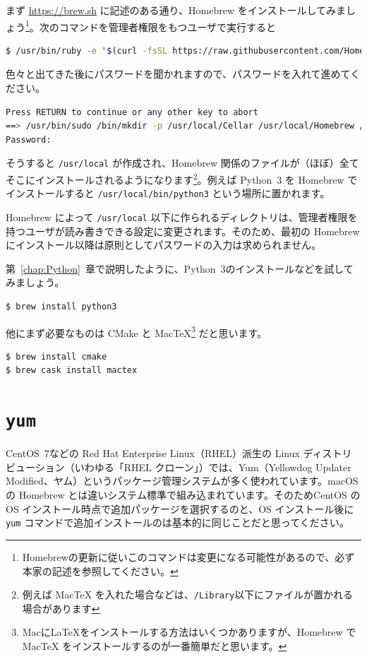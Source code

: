 まず \url{https://brew.sh} に記述のある通り、Homebrew をインストールしてみましょう\footnote{Homebrewの更新に従いこのコマンドは変更になる可能性があるので、必ず本家の記述を参照してください。}。次のコマンドを管理者権限をもつユーザで実行すると
\begin{lstlisting}[language=bash]
$ /usr/bin/ruby -e "$(curl -fsSL https://raw.githubusercontent.com/Homebrew/install/master/install)"
\end{lstlisting}
色々と出てきた後にパスワードを聞かれますので、パスワードを入れて進めてください。
\begin{lstlisting}[language=bash]
Press RETURN to continue or any other key to abort
==> /usr/bin/sudo /bin/mkdir -p /usr/local/Cellar /usr/local/Homebrew /usr/local/Frameworks /usr/local/bin /usr/local/etc /usr/local/include /usr/local/lib /usr/local/opt /usr/local/sbin /usr/local/share /usr/local/share/zsh /usr/local/share/zsh/site-functions /usr/local/var
Password:
\end{lstlisting}
そうすると \texttt{/usr/local} が作成され、Homebrew 関係のファイルが（ほぼ）全てそこにインストールされるようになります\footnote{例えば MacTeX を入れた場合などは、\texttt{/Library}以下にファイルが置かれる場合があります}。例えば Python~3 を Homebrew でインストールすると \texttt{/usr/local/bin/python3} という場所に置かれます。

Homebrew によって \texttt{/usr/local} 以下に作られるディレクトリは、管理者権限を持つユーザが読み書きできる設定に変更されます。そのため、最初の Homebrew にインストール以降は原則としてパスワードの入力は求められません。

第~\ref{chap:Python}~章で説明したように、Python~3のインストールなどを試してみましょう。

\begin{lstlisting}[language=bash]
$ brew install python3
\end{lstlisting}

他にまず必要なものは CMake と MacTeX\footnote{Macに\LaTeX をインストールする方法はいくつかありますが、Homebrew で MacTeX をインストールするのが一番簡単だと思います。} だと思います。
\begin{lstlisting}[language=bash]
$ brew install cmake
$ brew cask install mactex
\end{lstlisting}

\section{\texttt{yum}}

CentOS~7などの Red Hat Enterprise Linux（RHEL）派生の Linux ディストリビューション（いわゆる「RHEL クローン」）では、Yum（Yellowdog Updater Modified、ヤム）というパッケージ管理システムが多く使われています。macOS の Homebrew とは違いシステム標準で組み込まれています。そのためCentOS の OS インストール時点で追加パッケージを選択するのと、OS インストール後に \texttt{yum} コマンドで追加インストールのは基本的に同じことだと思ってください。

